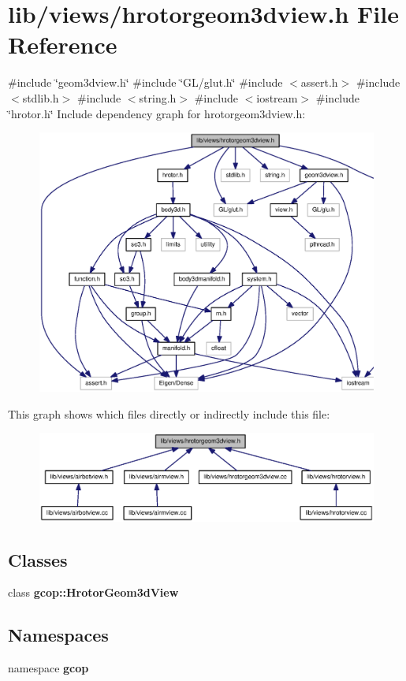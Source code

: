 \section{lib/views/hrotorgeom3dview.h \-File \-Reference}
\label{hrotorgeom3dview_8h}
{\ttfamily \#include \char`\"{}geom3dview.\-h\char`\"{}}\*
{\ttfamily \#include \char`\"{}\-G\-L/glut.\-h\char`\"{}}\*
{\ttfamily \#include $<$assert.\-h$>$}\*
{\ttfamily \#include $<$stdlib.\-h$>$}\*
{\ttfamily \#include $<$string.\-h$>$}\*
{\ttfamily \#include $<$iostream$>$}\*
{\ttfamily \#include \char`\"{}hrotor.\-h\char`\"{}}\*
\-Include dependency graph for hrotorgeom3dview.\-h\-:
\nopagebreak
\begin{figure}[H]
\begin{center}
\leavevmode
\includegraphics[width=350pt]{hrotorgeom3dview_8h__incl}
\end{center}
\end{figure}
\-This graph shows which files directly or indirectly include this file\-:
\nopagebreak
\begin{figure}[H]
\begin{center}
\leavevmode
\includegraphics[width=350pt]{hrotorgeom3dview_8h__dep__incl}
\end{center}
\end{figure}
\subsection*{\-Classes}
\begin{DoxyCompactItemize}
\item 
class {\bf gcop\-::\-Hrotor\-Geom3d\-View}
\end{DoxyCompactItemize}
\subsection*{\-Namespaces}
\begin{DoxyCompactItemize}
\item 
namespace {\bf gcop}
\end{DoxyCompactItemize}
